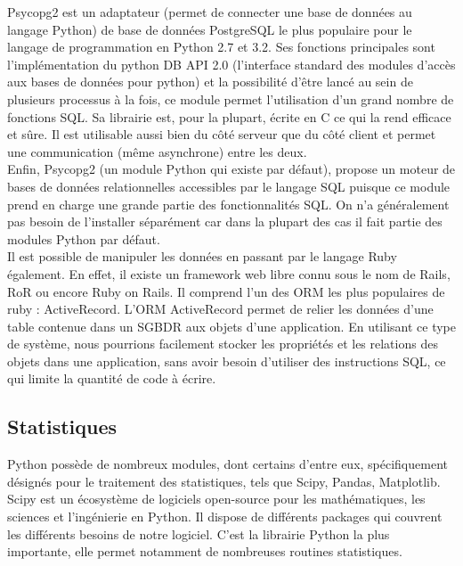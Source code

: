 \documentclass[a4paper]{report}
\begin{document}
Psycopg2\cite{ref21} est un adaptateur (permet de connecter une base de données au langage Python) de base de données PostgreSQL\cite{ref32} le plus populaire pour le langage de programmation en Python 2.7 et 3.2. Ses fonctions principales sont l'implémentation du python DB API 2.0\cite{ref33} (l’interface standard des modules d'accès aux bases de données pour python) et la possibilité d'être lancé au sein de plusieurs processus à la fois, ce module permet l'utilisation d'un grand nombre de fonctions SQL. Sa librairie est, pour la plupart, écrite en C ce qui la rend efficace et sûre. Il est utilisable aussi bien du côté serveur que du côté client et permet une communication (même asynchrone) entre les deux. \\
	Enfin, Psycopg2 (un module Python qui existe par défaut), propose un moteur de bases de données relationnelles accessibles par le langage SQL puisque ce module prend en charge une grande partie des fonctionnalités SQL.
On n'a généralement pas besoin de l’installer séparément car dans la plupart des cas il fait partie des modules Python par défaut. \\

	Il est possible de manipuler les données en passant par le langage Ruby également. En effet, il existe un framework web libre connu sous le nom de Rails\cite{ref34}, RoR ou encore Ruby on Rails. Il comprend l'un des ORM les plus populaires de ruby : ActiveRecord\cite{ref35}. L'ORM ActiveRecord permet de relier les données d'une table contenue dans un SGBDR aux objets d'une application. En utilisant ce type de système, nous pourrions facilement stocker les propriétés et les relations des objets dans une application, sans avoir besoin d'utiliser des instructions SQL, ce qui limite la quantité de code à écrire.


\subsection{Statistiques}

Python possède de nombreux modules, dont certains d’entre eux, spécifiquement désignés pour le traitement des statistiques, tels que Scipy\cite{ref24}, Pandas\cite{ref25}, Matplotlib\cite{ref27}. \\

Scipy est un écosystème de logiciels open-source pour les mathématiques, les sciences et l'ingénierie en Python. Il dispose de différents packages qui couvrent les différents besoins de notre logiciel. C'est la librairie Python la plus importante, elle permet notamment de nombreuses routines statistiques. \\
\end{document}
